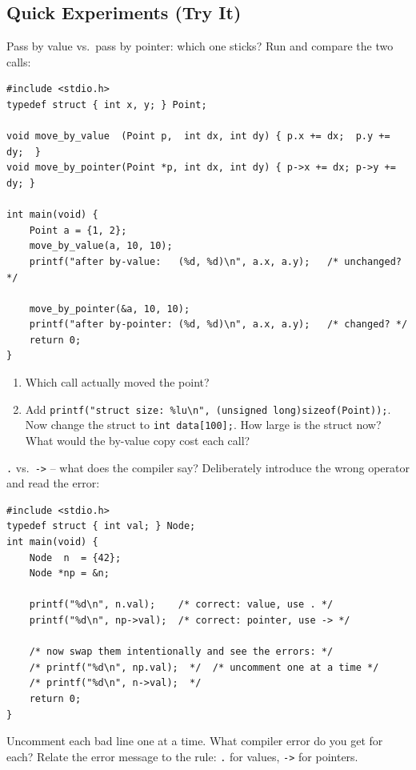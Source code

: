 \documentclass[11pt]{article}
\begin{document}
\subsection*{Quick Experiments (Try It)}

\begin{tryit}{Pass by value vs.\ pass by pointer: which one sticks?}
Run and compare the two calls:
\begin{lstlisting}
#include <stdio.h>
typedef struct { int x, y; } Point;

void move_by_value  (Point p,  int dx, int dy) { p.x += dx;  p.y += dy;  }
void move_by_pointer(Point *p, int dx, int dy) { p->x += dx; p->y += dy; }

int main(void) {
    Point a = {1, 2};
    move_by_value(a, 10, 10);
    printf("after by-value:   (%d, %d)\n", a.x, a.y);   /* unchanged? */

    move_by_pointer(&a, 10, 10);
    printf("after by-pointer: (%d, %d)\n", a.x, a.y);   /* changed? */
    return 0;
}
\end{lstlisting}
\begin{enumerate}[nosep,leftmargin=*]
  \item Which call actually moved the point?
  \item Add \texttt{printf("struct size: \%lu\textbackslash n", (unsigned long)sizeof(Point));}.
        Now change the struct to \texttt{int data[100];}.
        How large is the struct now? What would the by-value copy cost each call?
\end{enumerate}
\end{tryit}

\begin{tryit}{\texttt{.} vs.\ \texttt{->} -- what does the compiler say?}
Deliberately introduce the wrong operator and read the error:
\begin{lstlisting}
#include <stdio.h>
typedef struct { int val; } Node;
int main(void) {
    Node  n  = {42};
    Node *np = &n;

    printf("%d\n", n.val);    /* correct: value, use . */
    printf("%d\n", np->val);  /* correct: pointer, use -> */

    /* now swap them intentionally and see the errors: */
    /* printf("%d\n", np.val);  */  /* uncomment one at a time */
    /* printf("%d\n", n->val);  */
    return 0;
}
\end{lstlisting}
Uncomment each bad line one at a time. What compiler error do you get for each?
Relate the error message to the rule: \texttt{.} for values, \texttt{->} for pointers.
\end{tryit}
\end{document}

